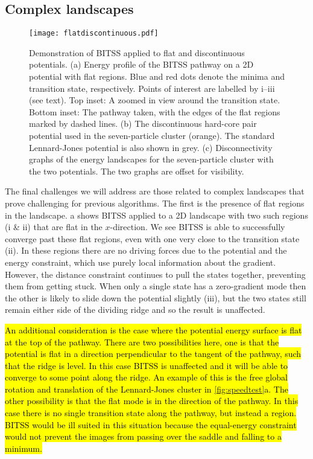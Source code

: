 \documentclass[aip,jcp,reprint,twocolumn]{revtex4-1}
\begin{document}
\subsection{Complex landscapes}
\begin{figure}[tb]
  \texttt{[image: flatdiscontinuous.pdf]}
  \caption{\label{fig:flatdiscontinuous}
    Demonstration of BITSS applied to flat and discontinuous potentials.
    (a) Energy profile of the BITSS pathway on a 2D potential with flat regions.
        Blue and red dots denote the minima and transition state, respectively.
        Points of interest are labelled by i--iii (see text).
        Top inset: A zoomed in view around the transition state.
        Bottom inset: The pathway taken, with the edges of the flat regions marked by dashed lines.
    (b) The discontinuous hard-core pair potential used in the seven-particle cluster (orange).
        The standard Lennard-Jones potential is also shown in grey.
    (c) Disconnectivity graphs of the energy landscapes for the seven-particle cluster with the two potentials.
        The two graphs are offset for visibility.
  }
\end{figure}

The final challenges we will address are those related to complex landscapes that prove challenging for previous algorithms.
The first is the presence of flat regions in the landscape.
a shows BITSS applied to a 2D landscape with two such regions (i \& ii) that are flat in the $x$-direction.
We see BITSS is able to successfully converge past these flat regions, even with one very close to the transition state (ii).
In these regions there are no driving forces due to the potential and the energy constraint, which use purely local information about the gradient.
However, the distance constraint continues to pull the states together, preventing them from getting stuck.
When only a single state has a zero-gradient mode then the other is likely to slide down the potential slightly (iii), but the two states still remain either side of the dividing ridge and so the result is unaffected.

\hl{An additional consideration is the case where the potential energy surface is flat at the top of the pathway.
There are two possibilities here, one is that the potential is flat in a direction perpendicular to the tangent of the pathway, such that the ridge is level.
In this case BITSS is unaffected and it will be able to converge to some point along the ridge.
An example of this is the free global rotation and translation of the Lennard-Jones cluster in {\cref{fig:speedtest}a}.
The other possibility is that the flat mode is in the direction of the pathway.
In this case there is no single transition state along the pathway, but instead a region.
BITSS would be ill suited in this situation because the equal-energy constraint would not prevent the images from passing over the saddle and falling to a minimum.}
\end{document}

